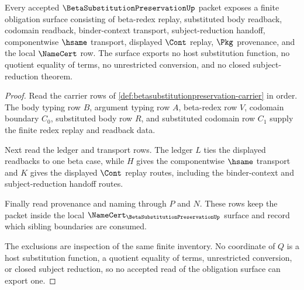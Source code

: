 \begin{theorem}
\label{thm:beta-substitution-preservation-obligation-surface}
Every accepted $\BetaSubstitutionPreservationUp$ packet exposes a finite obligation surface consisting of beta-redex replay, substituted body readback, codomain readback, binder-context transport, subject-reduction handoff, componentwise $\hsame$ transport, displayed $\Cont$ replay, $\Pkg$ provenance, and the local $\NameCert$ row. The surface exports no host substitution function, no quotient equality of terms, no unrestricted conversion, and no closed subject-reduction theorem.
\end{theorem}
\begin{proof}
Read the carrier rows of \autoref{def:betasubstitutionpreservation-carrier} in order. The body typing row $B$, argument typing row $A$, beta-redex row $V$, codomain boundary $C_0$, substituted body row $R$, and substituted codomain row $C_1$ supply the finite redex replay and readback data.

Next read the ledger and transport rows. The ledger $L$ ties the displayed readbacks to one beta case, while $H$ gives the componentwise $\hsame$ transport and $K$ gives the displayed $\Cont$ replay routes, including the binder-context and subject-reduction handoff routes.

Finally read provenance and naming through $P$ and $N$. These rows keep the packet inside the local $\NameCert_{\BetaSubstitutionPreservationUp}$ surface and record which sibling boundaries are consumed.

The exclusions are inspection of the same finite inventory. No coordinate of $Q$ is a host substitution function, a quotient equality of terms, unrestricted conversion, or closed subject reduction, so no accepted read of the obligation surface can export one.
\end{proof}

